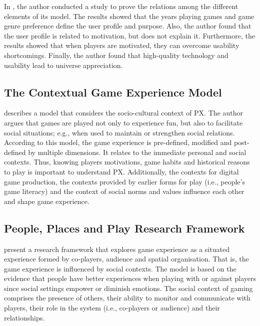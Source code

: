 In \autocite{Fernandez}, the author conducted a study to prove the relations among the different elements of its model. The results showed that the years playing games and game genre preference define the user profile and purpose. Also, the author found that the user profile is related to motivation, but does not explain it. Furthermore, the results showed that when players are motivated, they can overcome usability shortcomings. Finally, the author found that high-quality technology and usability lead to universe appreciation.

\subsection{The Contextual Game Experience Model}
\textcite{Mayra} describes a model that considers the socio-cultural context of \ac{PX}. The author argues that games are played not only to experience fun, but also to facilitate social situations; e.g., when used to maintain or strengthen social relations. According to this model, the game experience is pre-defined, modified and post-defined by multiple dimensions. It relates to the immediate personal and social contexts.  Thus, knowing players motivations, game habits and historical reasons to play is important to understand \ac{PX}. Additionally, the contexts for digital game production, the contexts provided by earlier forms for play (i.e., people's game literacy) and the context of social norms and values influence each other and shape game experience.

\subsection{People, Places and Play Research Framework}
\textcite{DeKort2007b} present a research framework that explores game experience as a situated experience formed by co-players, audience and spatial organisation. That is, the game experience is influenced by social contexts. The model is based on the evidence that people have better experiences when playing with or against players since social settings empower or diminish emotions. The social context of gaming comprises the presence of others, their ability to monitor and communicate with players, their role in the system (i.e., co-players or audience) and their relationships.


